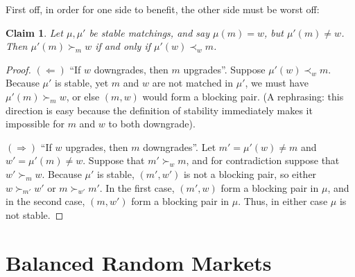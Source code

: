 \documentclass[12pt]{article}
\newtheorem{claim}[definition]{Claim}
\begin{document}
  First off, in order for one side to benefit, the other side must be worst off:
  \begin{claim}
    Let $\mu, \mu'$ be stable matchings, and say $\mu(m) = w$, but $\mu'(m)\ne w$.
    Then $\mu'(m) \succ_m w$ if and only if $\mu'(w) \prec_w m$.
  \end{claim}
  \begin{proof}
    $(\Leftarrow)$ ``If $w$ downgrades, then $m$ upgrades''.
    Suppose $\mu'(w) \prec_w m$. Because $\mu'$ is stable, yet $m$ and $w$
    are not matched in $\mu'$, we must have $\mu'(m) \succ_m w$,
    or else $(m,w)$ would form a blocking pair.
    (A rephrasing: this direction is easy because the definition of stability
    immediately makes it impossible for $m$ and $w$ to both downgrade).

    $(\Rightarrow)$ ``If $w$ upgrades, then $m$ downgrades''.
    Let $m' = \mu'(w) \ne m$ and $w' = \mu'(m) \ne w$.
    Suppose that $m' \succ_w m$, and for contradiction suppose that $w' \succ_m w$.
    Because $\mu'$ is stable, $(m', w')$ is not a blocking pair,
    so either $w\succ_{m'} w'$ or $m\succ_{w'} m'$.
    In the first case, $(m',w)$ form a blocking pair in $\mu$,
    and in the second case, $(m,w')$ form a blocking pair in $\mu$.
    Thus, in either case $\mu$ is not stable.


  \end{proof}



\section{Balanced Random Markets}
\end{document}
